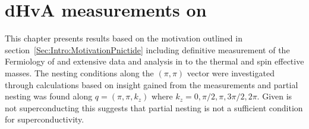 \chapter{dHvA measurements on \BaFeP{}}
    \label{Sec:ResD}

\begin{chapterabstract}
This chapter presents results based on the motivation outlined in section~\ref{Sec:Intro:MotivationPnictide} including definitive measurement of the Fermiology of \BaFeP{} and extensive data and analysis in to the thermal and spin effective masses. The nesting conditions along the $(\pi,\pi)$ vector were investigated through calculations based on insight gained from the measurements and partial nesting was found along $q=(\pi,\pi,k_z)$ where $k_z=0,\pi/2,\pi,3\pi/2,2\pi$. Given \BaFeP{} is not superconducting this suggests that partial nesting is not a sufficient condition for superconductivity.
\end{chapterabstract}

















